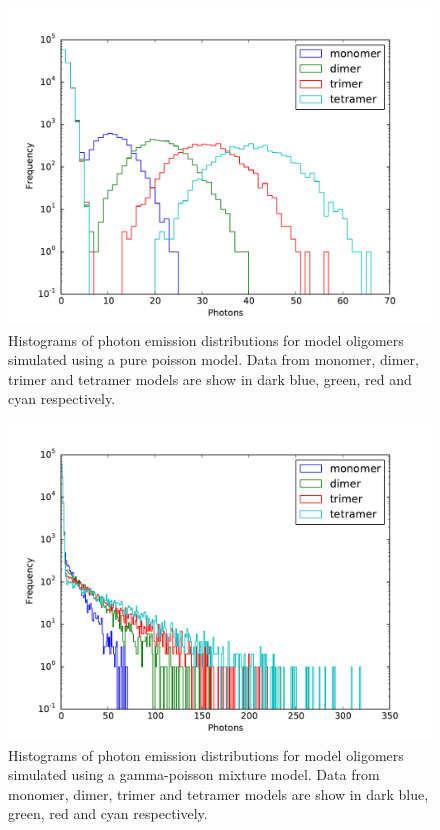 \begin{figure}
   \begin{center}
      \includegraphics*[clip=true, width=6in]{sizing/poisson_oligomers_log.pdf}
      \caption{Histograms of photon emission distributions for model oligomers simulated using a pure poisson model. Data from monomer, dimer, trimer and tetramer models are show in dark blue, green, red and cyan respectively.}
      \label{fig:poisson_oligomers}
   \end{center}
\end{figure}


\begin{figure}
   \begin{center}
      \includegraphics*[clip=true, width=6in]{sizing/gamma_poisson_oligomers_log.pdf}
      \caption{Histograms of photon emission distributions for model oligomers simulated using a gamma-poisson mixture model. Data from monomer, dimer, trimer and tetramer models are show in dark blue, green, red and cyan respectively.}
      \label{fig:gamma_poisson_oligomers}
   \end{center}
\end{figure}

